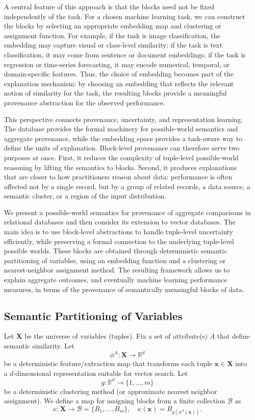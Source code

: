 \documentclass[10pt,a4paper]{scrartcl}
\theoremstyle{definition}
\theoremstyle{remark}
\begin{document}
A central feature of this approach is that the blocks need not be fixed 
independently of the task. For a chosen machine learning task, we can 
construct the blocks by selecting an appropriate embedding map and 
clustering or assignment function. For example, if the task is image 
classification, the embedding may capture visual or class-level similarity; 
if the task is text classification, it may come from sentence or document 
embeddings; if the task is regression or time-series forecasting, it may 
encode numerical, temporal, or domain-specific features. Thus, the choice 
of embedding becomes part of the explanation mechanism: by choosing an 
embedding that reflects the relevant notion of similarity for the task, 
the resulting blocks provide a meaningful provenance abstraction for the 
observed performance.

This perspective connects provenance, uncertainty, and representation 
learning. The database provides the formal machinery for possible-world 
semantics and aggregate provenance, while the embedding space provides a 
task-aware way to define the units of explanation. Block-level provenance 
can therefore serve two purposes at once. First, it reduces the complexity 
of tuple-level possible-world reasoning by lifting the semantics to blocks. 
Second, it produces explanations that are closer to how practitioners 
reason about data: performance is often affected not by a single record, 
but by a group of related records, a data source, a semantic cluster, or 
a region of the input distribution.

We present a possible-world semantics for provenance of aggregate comparisons 
in relational databases and then consider its extension to vector databases. 
The main idea is to use block-level abstractions to handle tuple-level uncertainty 
efficiently, while preserving a formal connection to the underlying tuple-level 
possible worlds. These blocks are obtained through deterministic semantic 
partitioning of variables, using an embedding function and a clustering or 
nearest-neighbor assignment method. The resulting framework allows us to explain 
aggregate outcomes, and eventually machine learning performance measures, 
in terms of the provenance of semantically meaningful blocks of data.

\subsection{Semantic Partitioning of Variables}

Let $\mathbf{X}$ be the universe of variables (tuples). Fix a set of attribute(s) $A$ that define semantic similarity. Let
\[
\phi^A: \mathbf{X} \to \mathbb{R}^d
\]
be a deterministic feature/extraction map that transforms each tuple $\mathbf{x} \in \mathbf{X}$ into a $d$-dimensional representation suitable for vector search. Let
\[
g: \mathbb{R}^d \to \{1, \dots, m\}
\]
be a deterministic clustering method (or approximate nearest neighbor assignment). We define a map for assigning blocks from a finite collection $\mathcal{B}$ as
\[
\kappa: \mathbf{X} \to \mathcal{B} = \{B_1, \dots, B_m\}, \quad \kappa(\mathbf{x}) = B_{g(\phi^A(\mathbf{x}))}.
\]
\end{document}
